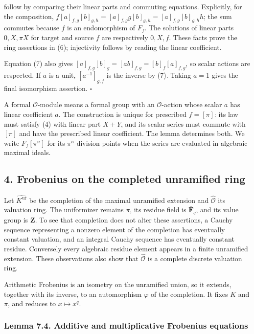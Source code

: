 \documentclass[11pt,a4paper]{article}
\begin{document}
follow by comparing their linear parts and commuting equations.
Explicitly, for the composition,
\(f[a]_{f,g}[b]_{g,h}=[a]_{f,g}g[b]_{g,h}=[a]_{f,g}[b]_{g,h}h\); the sum
commutes because \(f\) is an endomorphism of \(F_f\). The solutions of
linear parts \(0,X,\pi X\) for target and source \(f\) are respectively
\(0,X,f\). These facts prove the ring assertions in (6); injectivity
follows by reading the linear coefficient.

Equation (7) also gives \([a]_{f,g}[b]_g=[ab]_{f,g}=[b]_f[a]_{f,g}\), so
scalar actions are respected. If \(a\) is a unit, \([a^{-1}]_{g,f}\) is
the inverse by (7). Taking \(a=1\) gives the final isomorphism
assertion. \(\square\)

A formal \(\mathcal O\)-module means a formal group with an
\(\mathcal O\)-action whose scalar \(a\) has linear coefficient \(a\).
The construction is unique for prescribed \(f=[\pi]\): its law must
satisfy (4) with linear part \(X+Y\), and its scalar series must commute
with \([\pi]\) and have the prescribed linear coefficient. The lemma
determines both. We write \(F_f[\pi^n]\) for its \(\pi^n\)-division
points when the series are evaluated in algebraic maximal ideals.

\subsection{4. Frobenius on the completed unramified
ring}\label{frobenius-on-the-completed-unramified-ring}

Let \(\widehat{K^{\mathrm{ur}}}\) be the completion of the maximal
unramified extension and \(\widehat{\mathcal O}\) its valuation ring.
The uniformizer remains \(\pi\), its residue field is
\(\overline{\mathbf F}_q\), and its value group is \(\mathbf Z\). To see
that completion does not alter these assertions, a Cauchy sequence
representing a nonzero element of the completion has eventually constant
valuation, and an integral Cauchy sequence has eventually constant
residue. Conversely every algebraic residue element appears in a finite
unramified extension. These observations also show that
\(\widehat{\mathcal O}\) is a complete discrete valuation ring.

Arithmetic Frobenius is an isometry on the unramified union, so it
extends, together with its inverse, to an automorphism \(\varphi\) of
the completion. It fixes \(K\) and \(\pi\), and reduces to
\(x\mapsto x^q\).

\subsubsection{Lemma 7.4. Additive and multiplicative Frobenius
equations}\label{lemma-7.4.-additive-and-multiplicative-frobenius-equations}
\end{document}
